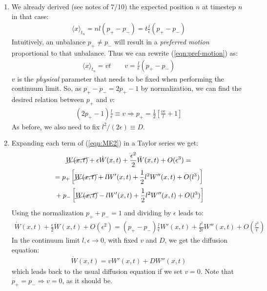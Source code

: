 \documentclass[../template.tex]{subfiles}
\begin{document}
\begin{exo}
    \begin{enumerate}
        \item We already derived (see notes of 7/10) the expected position $n$ at timestep $n$ in that case:
        \begin{align}
            \langle x \rangle_{t_n} = n l (p_+ - p_-) = t\frac{l}{\epsilon} (p_+ - p_-) \label{eqn:pref-motion}
        \end{align}
        Intuitively, an unbalance $p_+ \neq p_-$ will result in a \textit{preferred motion} proportional to that unbalance. Thus we can rewrite (\ref{eqn:pref-motion}) as: 
        \begin{align*}
            \langle x \rangle_{t_n} = vt \qquad v = \frac{l}{\epsilon}(p_+ - p_-) 
        \end{align*}
        $v$ is the \textit{physical} parameter that needs to be fixed when performing the continuum limit. So, as $p_+ - p_- = 2p_+ -1$ by normalization, we can find the desired relation between $p_+$ and $v$:
        \begin{align*}
            (2p_+ - 1) \frac{l}{\epsilon} \equiv v \Rightarrow p_+ = \frac{1}{2} \left[\frac{v \epsilon}{l} + 1 \right]  
        \end{align*}
        As before, we also need to fix $l^2/(2\epsilon) \equiv D$.
        \item Expanding each term of (\ref{eqn:ME2}) in a Taylor series we get:
        \begin{align*}
            \cancel{W(x,t)} + \epsilon \dot{W}(x,t) + \frac{\epsilon^2}{2} \ddot{W}(x,t) + O(\epsilon^3) = \span\\
            &= p_+ \left[\cancel{W(x,t)} + l W'(x,t) + \frac{1}{2} l^2 W''(x,t) + O(l^3) \right]\\
            &\> + p_- \left[\cancel{W(x,t)} - lW'(x,t) + \frac{1}{2} l^2 W''(x,t) + O(l^3)  \right]      
        \end{align*}
        Using the normalization $p_+ + p_- = 1$ and dividing by $\epsilon$ leads to:
        \begin{align*}
            \dot{W}(x,t) + \frac{\epsilon}{2} \ddot{W}(x,t) + O(\epsilon^2) = (p_+-p_-) \frac{l}{\epsilon} W'(x,t) + \frac{l^2}{2 \epsilon} W''(x,t) + O\left(\frac{l^3}{\epsilon} \right)   
        \end{align*}
        In the continuum limit $l, \epsilon \to 0$, with fixed $v$ and $D$, we get the diffusion equation:
        \begin{align*}
            \dot{W}(x,t) = v W'(x,t) + D W''(x,t)
        \end{align*}
        which leads back to the usual diffusion equation if we set $v = 0$. Note that $p_+ = p_- \Rightarrow v = 0$, as it should be. 
    \end{enumerate}
\end{exo}
\end{document}
